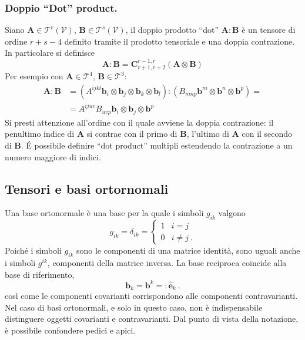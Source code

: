  \subsubsection{Doppio ``Dot'' product.}
 Siano $\bm{A} \in \mathcal{T}^r(\mathcal{V})$, $\bm{B} \in \mathcal{T}^s(\mathcal{V})$, il doppio prodotto ``dot'' $\bm{A} : \bm{B}$ è un tensore di ordine $r+s-4$ definito tramite il prodotto tensoriale e una doppia contrazione.
  In particolare si definisce
 \begin{equation}
  \bm{A} : \bm{B} = \bm{C}^{r-1,r}_{r+1,r+2} (\bm{A} \otimes \bm{B})
 \end{equation}
 Per esempio con $\bm{A} \in \mathcal{T}^4$, $\bm{B} \in \mathcal{T}^3$:
 \begin{equation}
 \begin{aligned}
  \bm{A} : \bm{B} & = (A^{ijkl} \bm{b}_i \otimes \bm{b}_j \otimes \bm{b}_k\otimes \bm{b}_l)
                             : (B_{mnp} \bm{b}^m \otimes \bm{b}^n \otimes \bm{b}^p) = \\
   & = A^{ijuv} B_{uvp} \bm{b}_i \otimes \bm{b}_j  \otimes \bm{b}^p
 \end{aligned}
 \end{equation}
 Si presti attenzione all'ordine con il quale avviene la doppia contrazione: il penultimo indice di $\bm{A}$ si contrae con il primo di $\bm{B}$, l'ultimo di $\bm{A}$ con il secondo di $\bm{B}$. \'E possibile definire ``dot product'' multipli estendendo la contrazione a un numero maggiore di indici.

\subsection{Tensori e basi ortornomali}
Una base ortonormale è una base per la quale i simboli $g_{ik}$ valgono
 \begin{equation}
  g_{ik} = \delta_{ik} = 
  \begin{cases}
   1 & i = j \\
   0 & i \ne j \ .
  \end{cases}
 \end{equation}
Poiché i simboli $g_{ik}$ sono le componenti di una matrice identità, sono uguali anche i simboli $g^{ik}$, componenti della matrice inversa. La base reciproca coincide alla base di riferimento,
\begin{equation}
    \bm{b}_k = \bm{b}^k =: \bm{\hat{e}}_k \ .
\end{equation}
così come le componenti covarianti corrispondono alle componenti contravarianti.
Nel caso di basi ortonormali, e solo in questo caso, non è indispensabile distinguere oggetti covarianti e contravarianti. Dal punto di vista della notazione, è possibile confondere pedici e apici.


